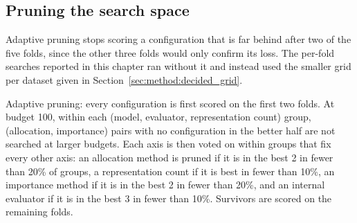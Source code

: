 \subsection{Pruning the search space}\label{sec:method:pruning}

Adaptive pruning stops scoring a configuration that is far behind after two of the five folds, since the other three folds would only confirm its loss. The per-fold searches reported in this chapter ran without it and instead used the smaller grid per dataset given in Section~\ref{sec:method:decided_grid}.

Adaptive pruning: every configuration is first scored on the first two folds. At budget 100, within each (model, evaluator, representation count) group, (allocation, importance) pairs with no configuration in the better half are not searched at larger budgets. Each axis is then voted on within groups that fix every other axis: an allocation method is pruned if it is in the best 2 in fewer than 20\% of groups, a representation count if it is best in fewer than 10\%, an importance method if it is in the best 2 in fewer than 20\%, and an internal evaluator if it is in the best 3 in fewer than 10\%. Survivors are scored on the remaining folds.


